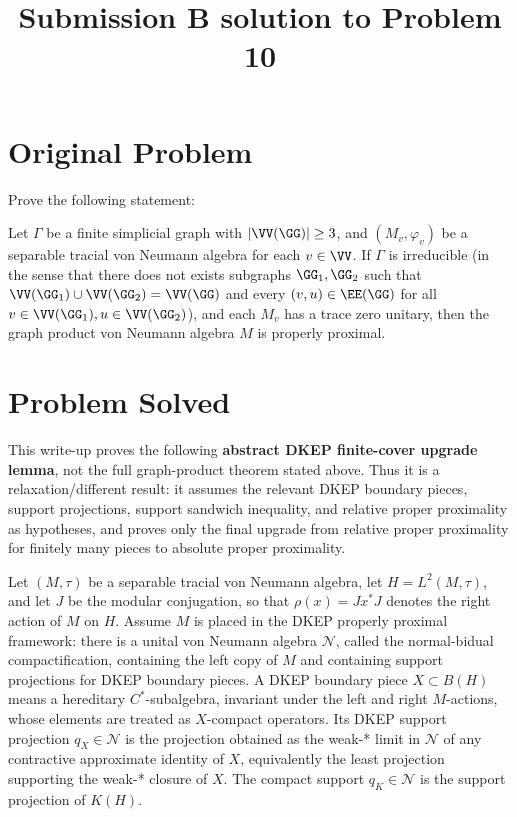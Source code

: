 \title{Submission B solution to Problem 10}
\date{}
\maketitle

\section*{Original Problem}

Prove the following statement:

Let $\Gamma$ be a finite simplicial graph with $|\VV(\GG)|\geq 3$, and $(M_v,\varphi_v)$ be a separable tracial von Neumann algebra for each $v\in \VV$. If $\Gamma$ is irreducible (in the sense that there does not exists subgraphs $\GG_1,\GG_2$ such that $ \VV(\GG_1)\cup \VV(\GG_2)=\VV(\GG) $ and every $(v,u)\in \EE(\GG) $ for all $v\in\VV(\GG_1),u\in \VV(\GG_2)$), and each $M_v$ has a trace zero unitary, then the graph product von Neumann algebra $M$ is properly proximal.

\section*{Problem Solved}

This write-up proves the following \textbf{abstract DKEP finite-cover upgrade lemma}, not the full graph-product theorem stated above. Thus it is a relaxation/different result: it assumes the relevant DKEP boundary pieces, support projections, support sandwich inequality, and relative proper proximality as hypotheses, and proves only the final upgrade from relative proper proximality for finitely many pieces to absolute proper proximality.

Let \((M,\tau)\) be a separable tracial von Neumann algebra, let \(H=L^2(M,\tau)\), and let \(J\) be the modular conjugation, so that \(\rho(x)=Jx^*J\) denotes the right action of \(M\) on \(H\). Assume \(M\) is placed in the DKEP properly proximal framework: there is a unital von Neumann algebra \(\mathcal N\), called the normal-bidual compactification, containing the left copy of \(M\) and containing support projections for DKEP boundary pieces. A DKEP boundary piece \(X\subset B(H)\) means a hereditary \(C^*\)-subalgebra, invariant under the left and right \(M\)-actions, whose elements are treated as \(X\)-compact operators. Its DKEP support projection \(q_X\in\mathcal N\) is the projection obtained as the weak-* limit in \(\mathcal N\) of any contractive approximate identity of \(X\), equivalently the least projection supporting the weak-* closure of \(X\). The compact support \(q_K\in\mathcal N\) is the support projection of \(K(H)\).

